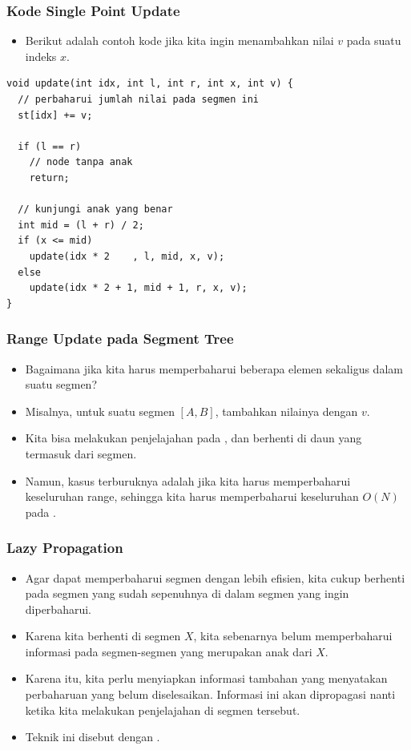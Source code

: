 \begin{frame}[fragile]
\frametitle{Kode Single Point Update}
\begin{itemize}
  \item Berikut adalah contoh kode jika kita ingin menambahkan nilai $v$ pada suatu indeks $x$.
\end{itemize}
\begin{lstlisting}
void update(int idx, int l, int r, int x, int v) {
  // perbaharui jumlah nilai pada segmen ini
  st[idx] += v;     

  if (l == r) 
    // node tanpa anak
    return;

  // kunjungi anak yang benar
  int mid = (l + r) / 2;
  if (x <= mid) 
    update(idx * 2    , l, mid, x, v);
  else 
    update(idx * 2 + 1, mid + 1, r, x, v);
}
\end{lstlisting}
\end{frame}

\begin{frame}
\frametitle{Range Update pada Segment Tree}
\begin{itemize}
  \item Bagaimana jika kita harus memperbaharui beberapa elemen sekaligus dalam suatu segmen?
  \item Misalnya, untuk suatu segmen $[A,B]$, tambahkan nilainya dengan $v$.
  \item Kita bisa melakukan penjelajahan pada \fsegmentTree, dan berhenti di daun yang termasuk dari segmen.
  \item Namun, kasus terburuknya adalah jika kita harus memperbaharui keseluruhan range, sehingga kita harus memperbaharui keseluruhan $O(N)$ \fnode pada \fsegmentTree.
\end{itemize}
\end{frame}

\begin{frame}
\frametitle{Lazy Propagation}
\begin{itemize}
  \item Agar dapat memperbaharui segmen dengan lebih efisien, kita cukup berhenti pada segmen yang sudah sepenuhnya di dalam segmen yang ingin diperbaharui.
  \item Karena kita berhenti di segmen $X$, kita sebenarnya belum memperbaharui informasi pada segmen-segmen yang merupakan anak dari $X$.
  \item Karena itu, kita perlu menyiapkan informasi tambahan yang menyatakan perbaharuan yang belum diselesaikan. Informasi ini akan dipropagasi nanti ketika kita melakukan penjelajahan di segmen tersebut.
  \item Teknik ini disebut dengan .
\end{itemize}
\end{frame}


